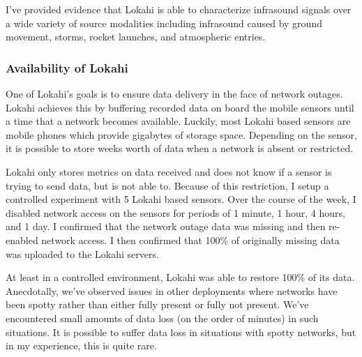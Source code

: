 I've provided evidence that Lokahi is able to characterize infrasound signals over a wide variety of source modalities including infrasound caused by ground movement, storms, rocket launches, and atmospheric entries.

\subsubsection{Availability of Lokahi}

One of Lokahi's goals is to ensure data delivery in the face of network outages. Lokahi achieves this by buffering recorded data on board the mobile sensors until a time that a network becomes available. Luckily, most Lokahi based sensors are mobile phones which provide gigabytes of storage space. Depending on the sensor, it is possible to store weeks worth of data when a network is absent or restricted.

Lokahi only stores metrics on data received and does not know if a sensor is trying to send data, but is not able to. Because of this restriction, I setup a controlled experiment with 5 Lokahi based sensors. Over the course of the week, I disabled network access on the sensors for periods of 1 minute, 1 hour, 4 hours, and 1 day. I confirmed that the network outage data was missing and then re-enabled network access. I then confirmed that 100\% of originally missing data was uploaded to the Lokahi servers.

At least in a controlled environment, Lokahi was able to restore 100\% of its data. Anecdotally, we've observed issues in other deployments where networks have been spotty rather than either fully present or fully not present. We've encountered small amounts of data loss (on the order of minutes) in such situations. It is possible to suffer data loss in situations with spotty networks, but in my experience, this is quite rare.

